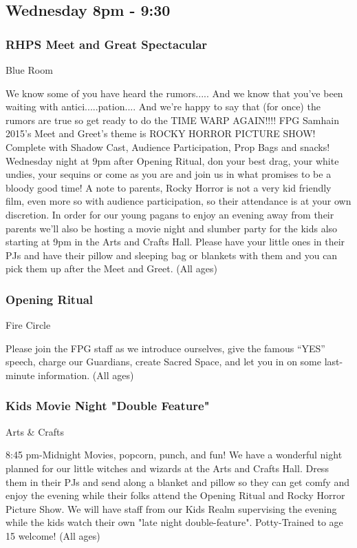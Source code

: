 

\subsection{Wednesday 8pm - 9:30}

\subsubsection{RHPS Meet and Great Spectacular}
\label{Wed-Meet-Greet}
{\small  Blue Room}

 We know some of you have heard the rumors.....
And we know that you've been waiting with antici.....pation....
And we're happy to say that (for once) the rumors are true so get ready to do the TIME WARP AGAIN!!!!
FPG Samhain 2015's Meet and Greet's theme is ROCKY HORROR PICTURE SHOW!
Complete with Shadow Cast, Audience Participation, Prop Bags and snacks!
Wednesday night at 9pm after Opening Ritual, don your best drag, your white undies, your sequins or come as you are and join us in what promises to be a bloody good time!
A note to parents, Rocky Horror is not a very kid friendly film, even more so with audience participation, so their attendance is at your own discretion. In order for our young pagans to enjoy an evening away from their parents we'll also be hosting a movie night and slumber party for the kids also starting at 9pm in the Arts and Crafts Hall. Please have your little ones in their PJs and have their pillow and sleeping bag or blankets with them and you can pick them up after the Meet and Greet. {\small (All ages)}

\subsubsection{Opening Ritual}
\label{Wed-OPENING}
{\small  Fire Circle}

 Please join the FPG staff as we introduce ourselves, give the famous ``YES'' speech, charge our Guardians, create Sacred Space, and let you in on some last-minute information. {\small (All ages)}

\subsubsection{Kids Movie Night "Double Feature"}
\label{Wed-kid-Meet}
{\small  Arts \& Crafts}

 8:45 pm-Midnight
Movies, popcorn, punch, and fun!  We have a wonderful night planned for our little witches and wizards at the Arts and Crafts Hall.  Dress them in their PJs and send along a blanket and pillow so they can get comfy and enjoy the evening while their folks attend the Opening Ritual and Rocky Horror Picture Show.  We will have staff from our Kids Realm supervising the evening while the kids watch their own "late night double-feature".  Potty-Trained to age 15 welcome! {\small (All ages)}